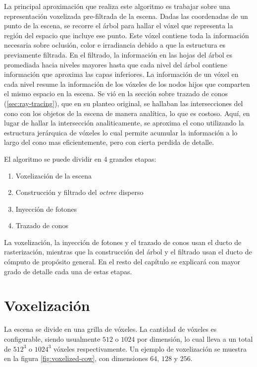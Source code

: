 La principal aproximación que realiza este algoritmo es trabajar sobre una representación voxelizada pre-filtrada de la escena.
Dadas las coordenadas de un punto de la escena, se recorre el árbol para hallar el vóxel que representa la región del espacio que incluye ese punto.
Este vóxel contiene toda la información necesaria sobre oclusión, color e irradiancia debido a que la estructura es previamente filtrada.
En el filtrado, la información en las hojas del árbol es promediada hacia niveles mayores hasta que cada nivel del árbol contiene información que aproxima las capas inferiores.
La información de un vóxel en cada nivel resume la información de los vóxeles de los nodos hijos que comparten el mismo espacio en la escena.
Se vió en la sección sobre trazado de conos (\ref{sec:ray-tracing}), que en su planteo original, se hallaban las intersecciones del cono con los objetos de la escena de manera analítica, lo que es costoso.
Aquí, en lugar de hallar la intersección analiticamente, se aproxima el cono utilizando la estructura jerárquica de vóxeles lo cual permite acumular la información a lo largo del cono mas eficientemente, pero con cierta perdida de detalle.

El algoritmo se puede dividir en 4 grandes etapas:

\begin{enumerate}
    \item Voxelización de la escena
    \item Construcción y filtrado del \textit{octree} disperso
    \item Inyección de fotones
    \item Trazado de conos
\end{enumerate}

La voxelización, la inyección de fotones y el trazado de conos usan el ducto de rasterización, mientras que la construcción del árbol y el filtrado usan el ducto de cómputo de propósito general.
En el resto del capítulo se explicará con mayor grado de detalle cada una de estas etapas.

\section{Voxelización}\label{sec:voxelization}

La escena se divide en una grilla de vóxeles.
La cantidad de vóxeles es configurable, siendo usualmente $512$ o $1024$ por dimensión, lo cual lleva a un total de $512^3$ o $1024^3$ vóxeles respectivamente.
Un ejemplo de voxelización se muestra en la figura \ref{fig:voxelized-cow}, con dimensiones $64$, $128$ y $256$.

